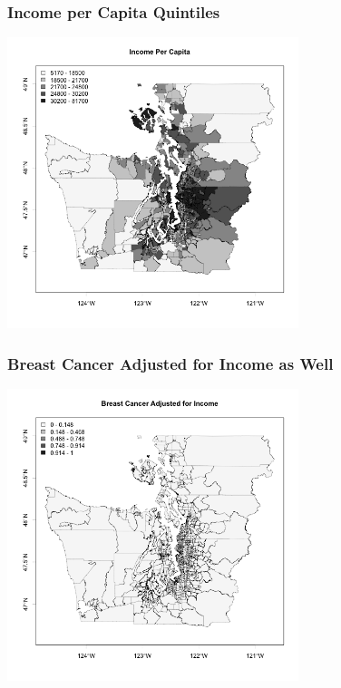 \documentclass[handout]{beamer}
\begin{document}
\begin{frame}[fragile]
\frametitle{Income per Capita Quintiles}
\begin{center}
\includegraphics[width=8.5cm]{figure/income.png}
\end{center}
\end{frame}


\begin{frame}[fragile]
\frametitle{Breast Cancer Adjusted for Income as Well}
\begin{center}
\includegraphics[width=8.5cm]{figure/breast_new.png}
\end{center}
\end{frame}
\end{document}
